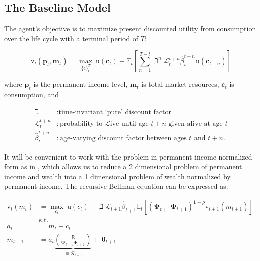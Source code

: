 \documentclass{article}
\newcommand{\DiscFac}{\beta}
\newcommand{\cFunc}{\mathrm{c}}
\newcommand{\uFunc}{\mathrm{u}}
\newcommand{\vFunc}{\mathrm{v}}
\newcommand{\Alive}{\mathcal{L}}
\newcommand{\cLvl}{\mathbf{c}}
\newcommand{\mLvl}{\mathbf{m}}
\newcommand{\pLvl}{\mathbf{p}}
\newcommand{\Ex}{\mathbb{E}}
\newcommand{\CRRA}{\rho}
\newcommand{\PermGroFac}{\pmb{\Phi}}
\newcommand{\Rfree}{\mathsf{R}}
\newcommand{\PermShk}{\mathbf{\Psi}}
\newcommand{\aNrm}{a}
\newcommand{\cNrm}{c}
\newcommand{\RNrm}{\mathcal{R}}
\newcommand{\TranShkEmp}{\pmb{\theta}}
\begin{document}
\subsection{The Baseline Model}\label{The Baseline Model}

The agent's objective is to maximize present discounted utility from consumption over the life cycle with a terminal period of $T$:

\begin{equation}
\label{eq:lifecyclemax}
\vFunc_{t}(\pLvl_{t},\mLvl_{t})  =    \max_{\{\cFunc\}_{t}^{T}} ~ \uFunc(\cLvl_{t})+\Ex_{t}\left[\sum_{n=1}^{T-t} {\beth}^{n} \Alive_{t}^{t+n}\hat{\DiscFac}_{t}^{t+n} \uFunc(\cLvl_{t+n}) \right]
\end{equation}

where $\pLvl_{t}$ is the permanent income level, $\mLvl_{t}$ is total market resources, $\cLvl_{t}$ is consumption, and

\begin{equation}
\begin{align}
    \beth & :  \text{time-invariant `pure' discount factor}
    \\ \Alive _{t}^{t+n} & :  \text{probability to }\Alive\text{ive until age $t+n$ given alive at age $t$}
    \\ \hat{\DiscFac}_{t}^{t+n} & :  \text{age-varying discount factor between ages $t$ and $t+n$.}
\end{align}
\end{equation}

It will be convenient to work with the problem in permanent-income-normalized form as in \cite{Carroll_2004}, which allows us to reduce a 2 dimensional problem of permanent income and wealth into a 1 dimensional problem of wealth normalized by permanent income. The recursive Bellman equation can be expressed as:

\begin{equation}
\begin{align}
    {\vFunc}_{t}({m}_{t}) & = \max_{\cNrm_{t}} ~ \uFunc(\cNrm_{t})+\beth\Alive_{t+1}\hat{\DiscFac}_{t+1}
    \Ex_{t}[(\PermShk_{t+1}\PermGroFac_{t+1})^{1-\CRRA}{\vFunc}_{t+1}({m}_{t+1})]
    \\ & \text{s.t.} & 
    \\ \aNrm_{t} & = {m}_{t}-\cNrm_{t} 
    \\ {m}_{t+1} & = \aNrm_{t}\underbrace{\left(\frac{\Rfree}{\PermShk_{t+1}\PermGroFac_{t+1}}\right)}_{\equiv \RNrm_{t+1}}
    + ~\TranShkEmp_{t+1}
\end{align}
\end{equation}
\end{document}
